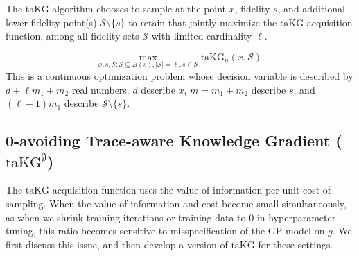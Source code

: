\documentclass[letterpaper]{article}
\newcommand{\taKG}{\text{taKG}}
\newcommand{\taKGE}{\text{taKG}^\emptyset}
\numberwithin{equation}{section}
\renewcommand{\S}{\mathcal{S}}
\begin{document}

The taKG algorithm chooses to sample at the point $x$, fidelity $s$, and additional lower-fidelity point(s) $\S \setminus \{s\}$ to retain that jointly maximize the $\taKG$ acquisition function, among all fidelity sets $\S$ with limited cardinality $\ell$.

\begin{equation}
\max_{x,s,\mathcal{S}:\mathcal{S}\subseteq B\left(s\right),\left|\mathcal{S}\right|=\ell,s\in\mathcal{S}} \taKG_n \left(x, \mathcal{S} \right).
\label{eqn:max-taKG}
\end{equation}
This is a continuous optimization problem whose decision variable is described by $d + \ell m_1 + m_2$ real numbers. $d$ describe $x$, $m=m_1+m_2$ describe $s$, and $(\ell-1)m_1$ describe $\S \setminus \{s\}$.

\subsection{0-avoiding Trace-aware Knowledge Gradient ($\taKGE$)}
\label{sect:mvoi}
The $\taKG$ acquisition function uses the value of information per unit cost of sampling.  
When the value of information and cost become small simultaneously, as when we shrink training iterations or training data to 0 in hyperparameter tuning, this ratio becomes sensitive to misspecification of the GP model on $g$. We first discuss this issue, and then develop a version of $\taKG$ for these settings.
\end{document}
